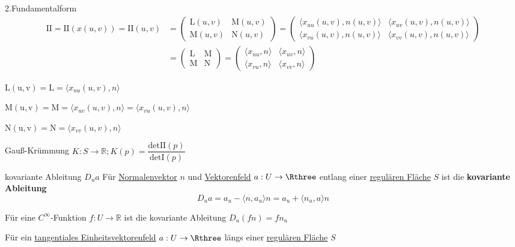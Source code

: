\begin{titleDef}{2.Fundamentalform}
\label{2Fundamentalform}
\label{II}
\begin{align*}
\mathrm{II}=\mathrm{II}(x(u,v))=\mathrm{II}(u,v) &= 
    \begin{pmatrix} 
        \mathrm{L}(u,v) & \mathrm{M}(u,v)\\
        \mathrm{M}(u,v) & \mathrm{N}(u,v)
    \end{pmatrix} = 
    \begin{pmatrix} 
        \langle x_{uu}(u,v),n(u,v)\rangle & \langle x_{uv}(u,v),n(u,v)\rangle\\
        \langle x_{vu}(u,v),n(u,v)\rangle & \langle x_{vv}(u,v),n(u,v)\rangle
    \end{pmatrix} 
    \\
    &= \begin{pmatrix} 
        \mathrm{L} & \mathrm{M}\\
        \mathrm{M} & \mathrm{N}
    \end{pmatrix} =
    \begin{pmatrix} 
        \langle x_{uu},n\rangle & \langle x_{uv},n\rangle\\
        \langle x_{vu},n\rangle & \langle x_{vv},n\rangle
    \end{pmatrix}
\end{align*}
\end{titleDef}

\begin{rawDef}
\label{L}
$\mathrm{L(u,v)} = \mathrm{L} = \langle x_{uu}(u,v),n\rangle$
\end{rawDef}

\begin{rawDef}
\label{M}
$\mathrm{M(u,v)} = \mathrm{M} = \langle x_{uv}(u,v),n\rangle = \langle x_{vu}(u,v),n\rangle$
\end{rawDef}

\begin{rawDef}
\label{N}
$\mathrm{N(u,v)} = \mathrm{N} = \langle x_{vv}(u,v),n\rangle$
\end{rawDef}

\begin{titleDef}{Gauß-Krümmung}
\label{Gaußkrümmung}
\label{K}
$K:S\to\mathbb{R}; K(p)=\dfrac{\text{det}\hyperref[II]{\mathrm{II}}(p)}
        {\text{det}\hyperref[I]{\mathrm{I}}(p)}$

\end{titleDef}   

\begin{titleDef}{kovariante Ableitung $D_ua$}
Für \hyperref[normalenvektor]{Normalenvektor} $n$ und \hyperref[vektorenfeld]{Vektorenfeld} $a:U\to\Rthree$ entlang einer \hyperref[regFlaeche]{regulären Fläche} $S$ ist die \textbf{kovariante Ableitung}
$$D_ua=a_u-\langle n,a_u\rangle n=a_u+\langle n_u,a\rangle n$$\par
Für eine $C^\infty$-Funktion $f:U\to\mathbb{R}$ ist die kovariante Ableitung $D_u(fn)=fn_u$\par
Für ein \hyperref[tangentialesVektorfeld]{tangentiales Einheitsvektorenfeld} $a:U\to\Rthree$ längs einer \hyperref[regFlaeche]{regulären Fläche} $S$
\end{titleDef}

